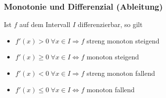 \subsubsection{Monotonie und Differenzial (Ableitung)}
Ist $f$ auf dem Intervall $I$ differenzierbar, so gilt
\begin{itemize}
	\item $f'(x) > 0 \; \forall x \in I \Rightarrow f$ streng monoton steigend
	\item $f'(x) \geq 0 \; \forall x \in I \Leftrightarrow f$ monoton steigend
	\item $f'(x) < 0 \; \forall x \in I \Rightarrow f$ streng monoton fallend
	\item $f'(x) \leq 0 \; \forall x \in I \Leftrightarrow f$ monoton fallend
\end{itemize}
